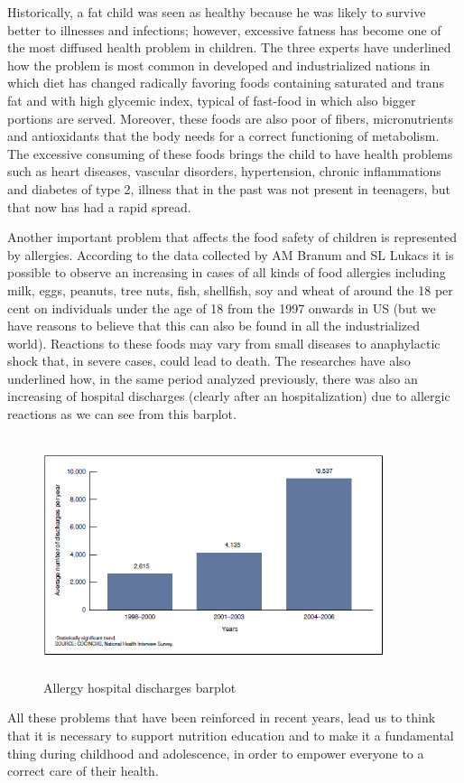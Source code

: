 Historically, a fat child was seen as healthy because he was likely to survive better to illnesses and infections; however, excessive fatness has become one of the most diffused health problem in children. The three experts have underlined how the problem is most common in developed and industrialized nations in which diet has changed radically favoring foods containing saturated and trans fat and with high glycemic index, typical of fast-food in which also bigger portions are served. Moreover, these foods are also poor of fibers, micronutrients and antioxidants that the body needs for a correct functioning of metabolism. The excessive consuming of these foods brings the child to have health problems such as heart diseases, vascular disorders, hypertension, chronic inflammations and diabetes of type 2, illness that in the past was not present in teenagers, but that now has had a rapid spread.\linebreak 

Another important problem that affects the food safety of children is represented by allergies.
According to the data collected by AM Branum and SL Lukacs \cite{FoodallergyUSchildren} it is possible to observe an increasing in cases of all kinds of food allergies including milk, eggs, peanuts, tree nuts, fish, shellfish, soy and wheat of around the 18 per cent on individuals under the age of 18 from the 1997 onwards in US (but we have reasons to believe that this can also be found in all the industrialized world). Reactions to these foods may vary from small diseases to anaphylactic shock that, in severe cases, could lead to death.
The researches have also underlined how, in the same period analyzed previously, there was also an increasing of hospital discharges (clearly after an hospitalization) due to allergic reactions as we can see from this barplot.
\begin{figure}[H]
\centering
\includegraphics[width=10cm, height=7cm]{immagini/allergybarplot.png}
\caption{Allergy hospital discharges barplot}\label{fig:allergybarplot}
\end{figure}
All these problems that have been reinforced in recent years, lead us to think that it is necessary to support nutrition education and to make it a fundamental thing during childhood and adolescence, in order to empower everyone to a correct care of their health.

